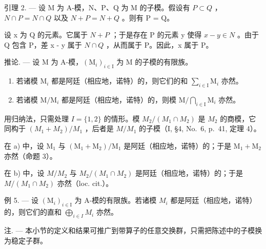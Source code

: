 引理 2. --- 设 M 为 A-模，N、P、Q 为 M 的子模。假设有 \(P \subset Q\) ，\(N \cap P = N \cap Q\) 以及 \(N + P = N + Q\) 。则有 P = Q。

设 x 为 Q 的元素。它属于 \(N + P\) ；于是存在 P 的元素 y 使得 \(x - y \in N\) 。由于 Q 包含 P，差 x - y 属于 \(N \cap Q\) ，从而属于 P。因此，x 属于 P。

推论. --- 设 M 为 A-模，\((\mathrm{M}_{i})_{i\in\mathrm{I}}\) 为 M 的子模的有限族。

\begin{enumerate}
\def\labelenumi{\alph{enumi})}
\item
  若诸模 \(\mathrm{M}_i\) 都是阿廷（相应地，诺特）的，则它们的和 \(\sum_{i\in \mathrm{I}}\mathrm{M}_i\) 亦然。
\item
  若诸模 \(\mathrm{M} / \mathrm{M}_i\) 都是阿廷（相应地，诺特）的，则模 \(\mathrm{M} / \bigcap_{i\in \mathrm{I}}\mathrm{M}_i\) 亦然。
\end{enumerate}

用归纳法，只需处理 \(I = \{1, 2\}\) 的情形。模 \(M_{2}/(M_{1} \cap M_{2})\) 是 \(M_{2}\) 的商模，它同构于 \((M_{1} + M_{2})/M_{1}\) ，后者是 \(M/M_{1}\) 的子模（I, §4, No.~6, p.~41, 定理 4）。

在 a) 中，设 \(\mathrm{M}_1\) 与 \((\mathrm{M}_1 + \mathrm{M}_2) / \mathrm{M}_1\) 是阿廷（相应地，诺特）的；于是 \(\mathrm{M}_1 + \mathrm{M}_2\) 亦然（命题 3）。

在 b) 中，设 \(M/M_{2}\) 与 \(M_{2}/(M_{1} \cap M_{2})\) 是阿廷（相应地，诺特）的；于是 \(M/(M_{1} \cap M_{2})\) 亦然（loc. cit.）。

例 5. --- 设 \((\mathrm{M}_{i})_{i\in\mathrm{I}}\) 为 A-模的有限族。若诸模 \(M_{i}\) 都是阿廷（相应地，诺特）的，则它们的直和 \(\bigoplus_{i\in I} M_{i}\) 亦然。

注. --- 本小节的定义和结果可推广到带算子的任意交换群，只需把陈述中的子模换为稳定子群。

